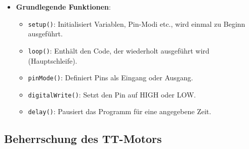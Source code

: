 \documentclass{vorlage-design-main}
\begin{document}
\begin{itemize}
\begin{itemize}
  \item
    \textbf{Grundlegende Funktionen}:

    \begin{itemize}
    
    \item
      \verb|setup()|: Initialisiert Variablen,
      Pin-Modi etc., wird einmal zu Beginn ausgeführt.
    \item
      \verb|loop()|: Enthält den Code, der wiederholt
      ausgeführt wird (Hauptschleife).
    \item
      \verb|pinMode()|: Definiert Pins als Eingang
      oder Ausgang.
    \item
      \verb|digitalWrite()|: Setzt den Pin auf HIGH
      oder LOW.
    \item
      \verb|delay()|: Pausiert das Programm für eine
      angegebene Zeit.
    \end{itemize}
  \end{itemize}
\end{itemize}

\hypertarget{beherrschung-des-tt-motors}{%
\subsection{Beherrschung des
TT-Motors}\label{beherrschung-des-tt-motors}}
\end{document}
